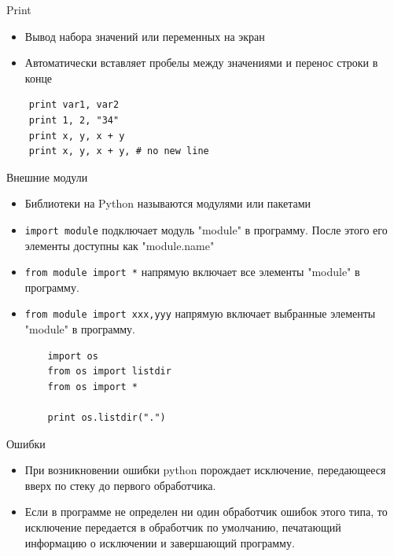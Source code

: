 \documentclass{article}
\begin{document}
\begin{center} Print \end{center}
\begin{itemize}
    \item Вывод набора значений или переменных на экран
    \item Автоматически вставляет пробелы между значениями и перенос строки в конце
\end{itemize}
\vspace{15pt}
\begin{lstlisting}
    print var1, var2
    print 1, 2, "34"
    print x, y, x + y
    print x, y, x + y, # no new line
\end{lstlisting}
\newpage

\begin{center} Внешние модули \end{center}
\begin{itemize}
    \item Библиотеки на Python называются модулями или пакетами
    \item \lstinline$import module$ подключает модуль "module" в программу. 
    После этого его элементы доступны как "module.name"
    \item \lstinline$from module import *$ напрямую включает все элементы "module" в программу. 
    \item \lstinline$from module import xxx,yyy$
        напрямую включает выбранные элементы "module" в программу. 
\vspace{15pt}

\begin{lstlisting}
    import os
    from os import listdir
    from os import *

    print os.listdir(".")
\end{lstlisting}
\end{itemize}
\newpage

\begin{center} Ошибки \end{center}
\begin{itemize}
    \item При возникновении ошибки python порождает исключение, 
    			передающееся вверх по стеку до первого обработчика.
    \item Если в программе не определен ни один обработчик ошибок этого типа, то исключение
    			передается в обработчик по умолчанию, печатающий информацию о исключении
    			и завершающий программу.
\end{itemize}
\end{document}
